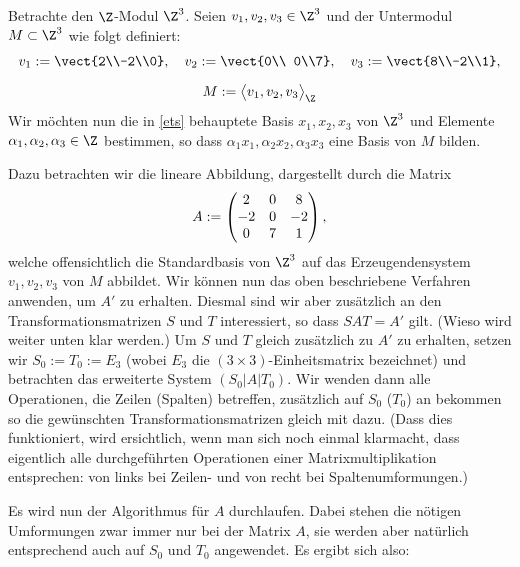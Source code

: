 \begin{thBeisp}\label{bsp:mat}
    Betrachte den $\Z$-Modul $\Z^3$. Seien $v_1,v_2,v_3 \in\Z^3$ und der
    Untermodul $M\subset\Z^3$ wie folgt definiert:
    \begin{gather*}
        v_1 := \vect{2\\-2\\0}, \quad 
        v_2 := \vect{0\\ 0\\7}, \quad
        v_3 := \vect{8\\-2\\1},
        \\[2mm]
        M := \Spann[\big]{v_1,v_2,v_3}_{\Z}
    \end{gather*}
    Wir möchten nun die in \cref{ets} behauptete Basis $x_1,x_2,x_3$ von
    $\Z^3$ und Elemente $\alpha_1,\alpha_2,\alpha_3\in\Z$ bestimmen, so dass
    $\alpha_1 x_1,\alpha_2 x_2,\alpha_3 x_3$ eine Basis von $M$ bilden.
    
    Dazu betrachten wir die lineare Abbildung, dargestellt durch die Matrix
    \[ A := \begin{pmatrix}  2 & 0 &  8 \\
                    -2 & 0 & -2 \\
                     0 & 7 &  1   \end{pmatrix}  , \]
    welche offensichtlich die Standardbasis von $\Z^3$ auf das Erzeugendensystem
    $v_1,v_2,v_3$ von $M$ abbildet. Wir können nun das oben beschriebene
    Verfahren anwenden, um $A'$ zu erhalten. Diesmal sind wir aber zusätzlich an
    den Transformationsmatrizen $S$ und $T$ interessiert, so dass $S\!AT = A'$
    gilt. (Wieso wird weiter unten klar werden.) Um $S$ und $T$ gleich
    zusätzlich zu $A'$ zu erhalten, setzen wir $S_0:=T_0:=E_3$ (wobei $E_3$ die
    $(3\times3)$-Einheitsmatrix bezeichnet) und betrachten das erweiterte System
    $(S_0|A|T_0)$. Wir wenden dann alle Operationen, die Zeilen (Spalten)
    betreffen, zusätzlich auf $S_0$ ($T_0$) an bekommen so die gewünschten 
    Transformationsmatrizen gleich mit dazu.
    (Dass dies funktioniert, wird ersichtlich, wenn man sich noch einmal klarmacht,
    dass eigentlich alle durchgeführten Operationen einer Matrixmultiplikation
    entsprechen: von links bei Zeilen- und von recht bei Spaltenumformungen.)
    
    Es wird nun der Algorithmus für $A$ durchlaufen. Dabei stehen die nötigen
    Umformungen zwar immer nur bei der Matrix $A$, sie werden aber natürlich
    entsprechend auch auf $S_0$ und $T_0$ angewendet. Es ergibt sich also:
    

\end{thBeisp}
